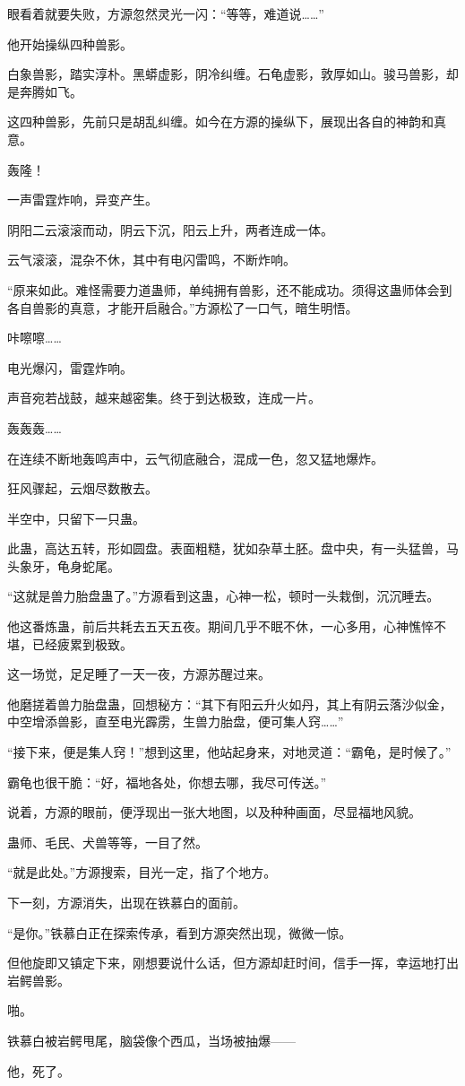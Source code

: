 \begin{this_body}
眼看着就要失败，方源忽然灵光一闪：“等等，难道说……”

他开始操纵四种兽影。

白象兽影，踏实淳朴。黑蟒虚影，阴冷纠缠。石龟虚影，敦厚如山。骏马兽影，却是奔腾如飞。

这四种兽影，先前只是胡乱纠缠。如今在方源的操纵下，展现出各自的神韵和真意。

轰隆！

一声雷霆炸响，异变产生。

阴阳二云滚滚而动，阴云下沉，阳云上升，两者连成一体。

云气滚滚，混杂不休，其中有电闪雷鸣，不断炸响。

“原来如此。难怪需要力道蛊师，单纯拥有兽影，还不能成功。须得这蛊师体会到各自兽影的真意，才能开启融合。”方源松了一口气，暗生明悟。

咔嚓嚓……

电光爆闪，雷霆炸响。

声音宛若战鼓，越来越密集。终于到达极致，连成一片。

轰轰轰……

在连续不断地轰鸣声中，云气彻底融合，混成一色，忽又猛地爆炸。

狂风骤起，云烟尽数散去。

半空中，只留下一只蛊。

此蛊，高达五转，形如圆盘。表面粗糙，犹如杂草土胚。盘中央，有一头猛兽，马头象牙，龟身蛇尾。

“这就是兽力胎盘蛊了。”方源看到这蛊，心神一松，顿时一头栽倒，沉沉睡去。

他这番炼蛊，前后共耗去五天五夜。期间几乎不眠不休，一心多用，心神憔悴不堪，已经疲累到极致。

这一场觉，足足睡了一天一夜，方源苏醒过来。

他磨搓着兽力胎盘蛊，回想秘方：“其下有阳云升火如丹，其上有阴云落沙似金，中空增添兽影，直至电光霹雳，生兽力胎盘，便可集人窍……”

“接下来，便是集人窍！”想到这里，他站起身来，对地灵道：“霸龟，是时候了。”

霸龟也很干脆：“好，福地各处，你想去哪，我尽可传送。”

说着，方源的眼前，便浮现出一张大地图，以及种种画面，尽显福地风貌。

蛊师、毛民、犬兽等等，一目了然。

“就是此处。”方源搜索，目光一定，指了个地方。

下一刻，方源消失，出现在铁慕白的面前。

“是你。”铁慕白正在探索传承，看到方源突然出现，微微一惊。

但他旋即又镇定下来，刚想要说什么话，但方源却赶时间，信手一挥，幸运地打出岩鳄兽影。

啪。

铁慕白被岩鳄甩尾，脑袋像个西瓜，当场被抽爆——

他，死了。

\end{this_body}

